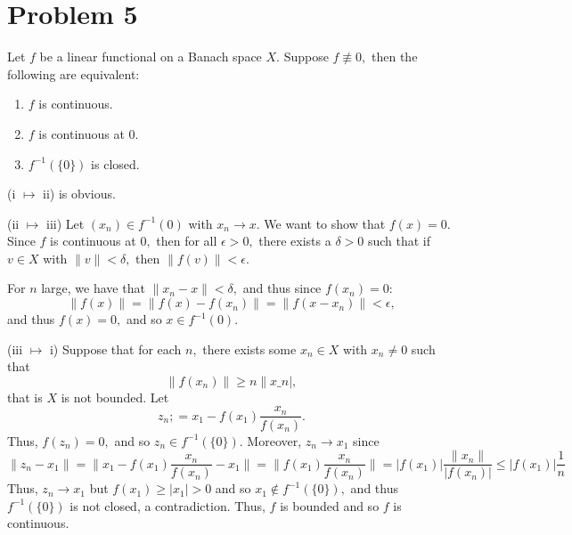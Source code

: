 \documentclass[11pt]{article}
\begin{document}
\newpage
\section*{Problem 5}
\begin{problem}
    Let $f$ be a linear functional on a Banach space $X.$ Suppose $f\not \equiv 0,$ then the following are equivalent:
    \begin{enumerate}
        \item $f$ is continuous.
        \item $f$ is continuous at $0.$
        \item $f^{-1}(\{0\})$ is closed.
    \end{enumerate}
\end{problem}

\begin{solution}
    (i $\mapsto$ ii) is obvious. 

    (ii $\mapsto$ iii) Let $(x_n)\in f^{-1}(0)$ with $x_n \to x.$ We want to show that $f(x) = 0.$ Since $f$ is continuous at $0,$ then for all $\epsilon>0,$ there exists a $\delta>0$ such that if $v\in X$ with $\|v\|< \delta,$ then $\|f(v)\|< \epsilon.$
    
    For $n$ large, we have that $\|x_n - x\|<\delta,$ and thus since $f(x_n) = 0:$
    \[\|f(x)\| = \|f(x) - f(x_n)\| = \|f(x - x_n)\| < \epsilon,\] and thus $f(x) = 0,$ and so $x\in f^{-1}(0).$

    (iii $\mapsto$ i) Suppose that for each $n,$ there exists some $x_n \in X$ with $x_n \neq 0$ such that 
    \[\|f(x_n)\| \geq n\|x\_n|,\] that is $X$ is not bounded. Let 
    \[z_n ;= x_1 - f(x_1)\frac{x_n}{f(x_n)}.\] Thus, $f(z_n) = 0,$ and so $z_n \in f^{-1}(\{0\}).$ Moreover, $z_n \to x_1$ since 
    \[\|z_n - x_1\| = \| x_1 - f(x_1)\frac{x_n}{f(x_n)} - x_1\| = \|f(x_1) \frac{x_n}{f(x_n)}\| = |f(x_1)|\frac{\|x_n\|}{|f(x_n)|} \leq |f(x_1)|\frac{1}{n}\]
    Thus, $z_n \to x_1$ but $f(x_1) \geq |x_1|>0$ and so $x_1 \notin f^{-1}(\{0\}),$ and thus $f^{-1}(\{0\})$ is not closed, a contradiction. Thus, $f$ is bounded and so $f$ is continuous.
\end{solution}

\newpage
\end{document}
